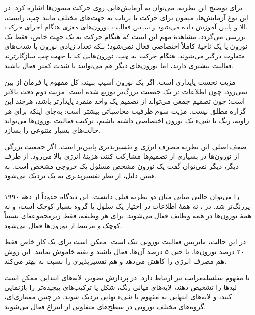 برای توضیح این نظریه، می‌توان به آزمایش‌هایی روی حرکت میمون‌ها اشاره کرد. در این نوع آزمایش‌ها، میمون برای حرکت یا پرتاب به جهت‌های مختلف مانند چپ، راست، بالا و پایین آموزش داده می‌شود و سپس فعالیت نورون‌های مغزی هنگام اجرای حرکت بررسی می‌گردد. مشاهدهٔ مهم این است که هنگام حرکت به یک جهت خاص، فقط یک نورون یا یک ناحیهٔ کاملاً اختصاصی فعال نمی‌شود؛ بلکه تعداد زیادی نورون با شدت‌های متفاوت درگیر می‌شوند. هنگام حرکت به چپ، نورون‌هایی که با جهت چپ سازگارترند فعالیت بیشتری دارند، اما نورون‌های دیگر هم می‌توانند با شدت کمتر فعال باشند.

مزیت نخست  پایداری است. اگر یک نورون آسیب ببیند، کل مفهوم یا فرمان از بین نمی‌رود، چون اطلاعات در یک جمعیت بزرگ‌تر توزیع شده است. مزیت دوم دقت بالاتر است؛ چون تصمیم جمعی می‌تواند از تصمیم یک واحد منفرد پایدارتر باشد، هرچند این گزاره مطلق نیست. مزیت سوم ظرفیت محاسباتی بیشتر است: به‌جای اینکه برای هر زاویه، رنگ یا شیء یک نورون اختصاصی داشته باشیم، ترکیب فعالیت نورون‌ها می‌تواند حالت‌های بسیار متنوعی را بسازد.

ضعف اصلی این نظریه مصرف انرژی و تفسیرپذیری پایین‌تر است. اگر جمعیت بزرگی از نورون‌ها در بسیاری از تصمیم‌ها مشارکت کنند، هزینهٔ انرژی بالا می‌رود. از طرف دیگر، دیگر نمی‌توان گفت یک نورون مشخص مسئول یک خروجی مشخص است. به همین دلیل،  از نظر تفسیرپذیری به یک  نزدیک می‌شود.

\subsubsection{}
 را می‌توان حالتی میانی میان دو نظریهٔ قبلی دانست. این دیدگاه حدوداً از دههٔ ۱۹۹۰ پررنگ‌تر شد. در ، نه همهٔ اطلاعات در اختیار یک سلول یا گروه بسیار کوچک است، و نه همهٔ نورون‌ها در همهٔ وظایف فعال می‌شوند. برای هر وظیفه، فقط زیرمجموعه‌ای نسبتاً کوچک و مرتبط از نورون‌ها فعال می‌شود.

در این حالت، ماتریس فعالیت نورونی تنک است. ممکن است برای یک کار خاص فقط ۲۰ درصد نورون‌ها، یا حتی ۵ درصد آن‌ها، فعال باشند و بقیه خاموش بمانند. این روش هم مصرف انرژی را کاهش می‌دهد و هم تفسیرپذیری را نسبت به  بهتر می‌کند.

 با مفهوم سلسله‌مراتب نیز ارتباط دارد. در پردازش تصویر، لایه‌های ابتدایی ممکن است لبه‌ها را تشخیص دهند، لایه‌های میانی رنگ، شکل یا ترکیب‌های پیچیده‌تر را بازنمایی کنند، و لایه‌های انتهایی به مفهوم یا شیء نهایی نزدیک شوند. در چنین معماری‌ای، گروه‌های مختلف نورونی در سطح‌های متفاوتی از انتزاع فعال می‌شوند.

